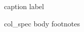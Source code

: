 \begin{table}[{{position}}]
\centering
{{caption}}
{{label}}
\begin{tabular}{{{col_spec}}}
\toprule
{{body}}
\bottomrule
{{footnotes}}
\end{tabular}
\end{table}
